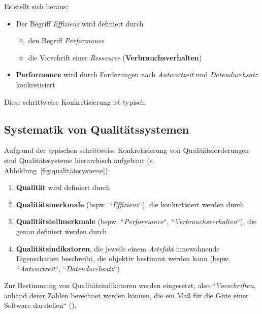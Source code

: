 \noindent
Es stellt sich heraus:

\begin{itemize}
    \item Der Begriff \textit{Effizienz} wird definiert durch
    \begin{itemize}
        \item den Begriff \textit{Performance}
        \item die Vorschrift einer \textit{Ressource} (\textbf{Verbrauchsverhalten})
    \end{itemize}
    \item \textbf{Performance} wird durch Forderungen nach \textit{Antwortzeit} und \textit{Datendurchsatz} konkretisiert
\end{itemize}

\noindent
Diese schrittweise Konkretisierung ist typisch.

\subsection*{Systematik von Qualitätssystemen}
Aufgrund der typischen schrittweise Konkretisierung von Qualitätsforderungen sind Qualitätssysteme hierarchisch aufgebaut (s. Abbildung~\ref{fig:qualitätssysteme}):

\begin{enumerate}
    \item \textbf{Qualität} wird definiert durch
    \item \textbf{Qualitätsmerkmale} (bspw. ``\textit{Effizienz}``), die konkretisiert werden durch
    \item \textbf{Qualitätsteilmerkmale} (bspw. ``\textit{Performance}``, ``\textit{Verbrauchsverhalten}``), die genau definiert werden durch
    \item \textbf{Qualitätsindikatoren}, die jeweils einem \textit{Artefakt} innewohnende Eigenschaften beschreibt, die objektiv bestimmt werden kann (bspw. ``\textit{Antwortzeit}``, ``\textit{Datendurchsatz}``)
\end{enumerate}

\noindent
Zur Bestimmung von Qualitätsindikatoren werden  eingesetzt, also ``\textit{Vorschriften}, anhand derer Zahlen berechnet werden können, die ein Maß für die Güte einer Software darstellen`` (\cite[3]{Wed09c}).


